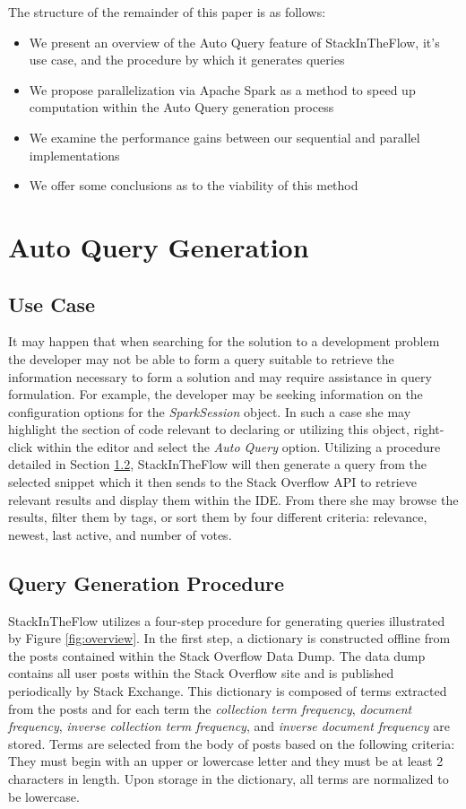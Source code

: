 \documentclass[conference]{IEEEtran}
\newcommand{\so}{Stack Overflow\xspace}
\newcommand{\sitf}{{\sc StackInTheFlow}\xspace}
\begin{document}
The structure of the remainder of this paper is as follows:
\begin{itemize}
	\item We present an overview of the Auto Query feature of \sitf, it's use case, and the procedure by which it generates queries
	\item We propose parallelization via Apache Spark as a method to speed up computation within the Auto Query generation process
	\item We examine the performance gains between our sequential and parallel implementations 
	\item We offer some conclusions as to the viability of this method
\end{itemize}

\section{Auto Query Generation}

\subsection{Use Case} \label{subsec:UseCase}
It may happen that when searching for the solution to a development problem the developer may not be able to form a query suitable to retrieve the information necessary to form a solution and may require assistance in query formulation.  For example, the developer may be seeking information on the configuration options for the \textit{SparkSession} object. In such a case she may highlight the section of code relevant to declaring or utilizing this object, right-click within the editor and select the \textit{Auto Query} option.  Utilizing a procedure detailed in Section \ref{subsec:QueryGen}, \sitf will then generate a query from the selected snippet which it then sends to the \so API to retrieve relevant results and display them within the IDE. From there she may browse the results, filter them by tags, or sort them by four different criteria: relevance, newest, last active, and number of votes.

\subsection{Query Generation Procedure} \label{subsec:QueryGen}
\sitf utilizes a four-step procedure for generating queries illustrated by Figure \ref{fig:overview}. In the first step, a dictionary is constructed offline from the posts contained within the \so Data Dump.  The data dump contains all user posts within the \so site and is published periodically by Stack Exchange. This dictionary is composed of terms extracted from the posts and for each term the \textit{collection term frequency}, \textit{document frequency}, \textit{inverse collection term frequency}, and \textit{inverse document frequency} are stored. Terms are selected from the body of posts based on the following criteria: They must begin with an upper or lowercase letter and they must be at least 2 characters in length. Upon storage in the dictionary, all terms are normalized to be lowercase.
\end{document}
